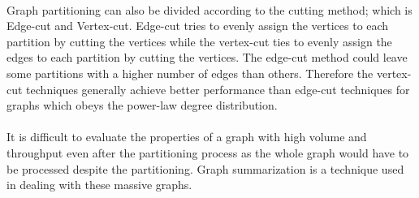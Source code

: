 \paragraph{}
Graph partitioning can also be divided according to the cutting method; which is Edge-cut and Vertex-cut\cite{xie_s-powergraph_nodate}. Edge-cut tries to evenly assign the vertices to each partition by cutting the vertices while the vertex-cut ties to evenly assign the edges to each partition by cutting the vertices. The edge-cut method could leave some partitions with a higher number of edges than others. Therefore the vertex-cut techniques generally achieve better performance than edge-cut techniques\cite{gonzalez_powergraph_nodate} for graphs which obeys the power-law degree distribution.

\paragraph{}
It is difficult to evaluate the properties of a graph with high volume and throughput even after the partitioning process as the whole graph would have to be processed despite the partitioning. Graph summarization is a technique used in dealing with these massive graphs.